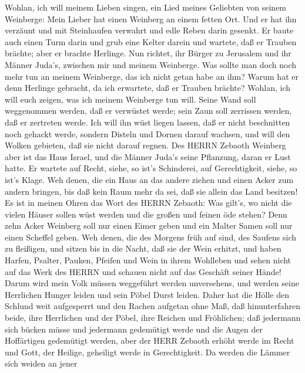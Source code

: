  Wohlan, ich will meinem Lieben singen, ein Lied meines
Geliebten von seinem Weinberge: Mein Lieber hat einen Weinberg an einem
fetten Ort.  Und er hat ihn verzäunt und mit Steinhaufen
verwahrt und edle Reben darin gesenkt. Er baute auch einen Turm darin
und grub eine Kelter darein und wartete, daß er Trauben brächte; aber er
brachte Herlinge.  Nun richtet, ihr Bürger zu Jerusalem und
ihr Männer Juda's, zwischen mir und meinem Weinberge.  Was
sollte man doch noch mehr tun an meinem Weinberge, das ich nicht getan
habe an ihm? Warum hat er denn Herlinge gebracht, da ich erwartete, daß
er Trauben brächte?  Wohlan, ich will euch zeigen, was ich
meinem Weinberge tun will. Seine Wand soll weggenommen werden, daß er
verwüstet werde; sein Zaun soll zerrissen werden, daß er zertreten
werde.  Ich will ihn wüst liegen lassen, daß er nicht
beschnitten noch gehackt werde, sondern Disteln und Dornen darauf
wachsen, und will den Wolken gebieten, daß sie nicht darauf regnen.
 Des HERRN Zebaoth Weinberg aber ist das Haus Israel, und
die Männer Juda's seine Pflanzung, daran er Lust hatte. Er wartete auf
Recht, siehe, so ist's Schinderei, auf Gerechtigkeit, siehe, so ist's
Klage.  Weh denen, die ein Haus an das andere ziehen und
einen Acker zum andern bringen, bis daß kein Raum mehr da sei, daß sie
allein das Land besitzen!  Es ist in meinen Ohren das Wort
des HERRN Zebaoth: Was gilt's, wo nicht die vielen Häuser sollen wüst
werden und die großen und feinen öde stehen?  Denn zehn
Acker Weinberg soll nur einen Eimer geben und ein Malter Samen soll nur
einen Scheffel geben.  Weh denen, die des Morgens früh auf
sind, des Saufens sich zu fleißigen, und sitzen bis in die Nacht, daß
sie der Wein erhitzt,  und haben Harfen, Psalter, Pauken,
Pfeifen und Wein in ihrem Wohlleben und sehen nicht auf das Werk des
HERRN und schauen nicht auf das Geschäft seiner Hände! 
Darum wird mein Volk müssen weggeführt werden unversehens, und werden
seine Herrlichen Hunger leiden und sein Pöbel Durst leiden.
 Daher hat die Hölle den Schlund weit aufgesperrt und den
Rachen aufgetan ohne Maß, daß hinunterfahren beide, ihre Herrlichen und
der Pöbel, ihre Reichen und Fröhlichen;  daß jedermann sich
bücken müsse und jedermann gedemütigt werde und die Augen der
Hoffärtigen gedemütigt werden,  aber der HERR Zebaoth
erhöht werde im Recht und Gott, der Heilige, geheiligt werde in
Gerechtigkeit.  Da werden die Lämmer sich weiden an jener
